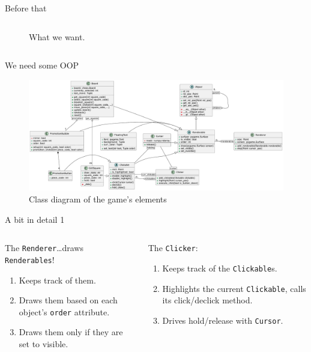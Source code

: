 \documentclass[english]{beamer}
\begin{document}
\begin{frame}{Before that}
\begin{columns}[T]
\begin{column}{.5\textwidth}
\begin{figure}
                \caption{What we want.}
            \end{figure}
        \end{column}
    \end{columns}
\end{frame}

\begin{frame}{We need some OOP}
    \begin{figure}
        \centering
        \includegraphics[width=.98\textwidth]{images/uml.pdf}
        \caption{Class diagram of the game's elements}
    \end{figure}
\end{frame}

\begin{frame}{A bit in detail 1}
    \begin{columns}[T]
        \begin{column}{.5\textwidth}
            The \texttt{Renderer}\dots draws \texttt{Renderables}!
            \begin{enumerate}
                \item Keeps track of them.
                \item Draws them based on each object's \texttt{order} attribute.
                \item Draws them only if they are set to visible.
            \end{enumerate}
        \end{column}
        \begin{column}{.5\textwidth}
            The \texttt{Clicker}:
            \begin{enumerate}
                \item Keeps track of the \texttt{Clickable}s.
                \item Highlights the current \texttt{Clickable}, calls its click/declick method.
                \item Drives hold/release with \texttt{Cursor}.
            \end{enumerate}
        \end{column}
    \end{columns}
\end{frame}
\end{document}
